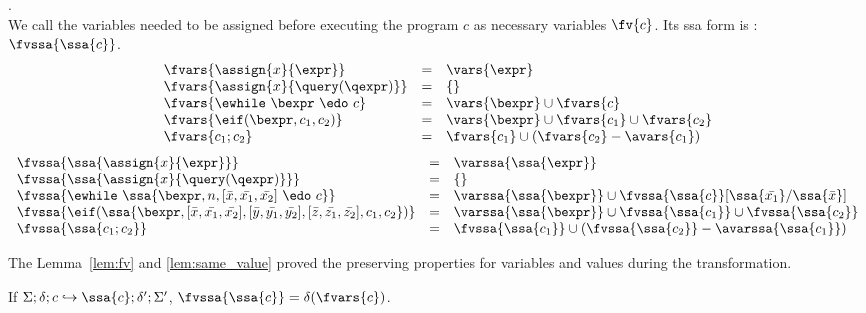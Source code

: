 \begin{defn}.
\\
{
We call the variables needed to be assigned before executing the program $c$ as necessary variables $\fv{c}$. Its ssa form is : $\fvssa{\ssa{c}}$.
}  
 \[
 \begin{array}{lll}
     \fvars{\assign{x}{\expr} }  & = & \vars{\expr}  \\
     \fvars{\assign{x}{\query(\qexpr)} }  & = & \{ \}  \\
     {\fvars{  \ewhile ~ \bexpr ~ \edo ~ c  } }&= & \vars{\bexpr} \cup \fvars{c} \\
     \fvars{\eif(\bexpr, c_1, c_2)} & =& \vars{\bexpr} \cup \fvars{c_1} \cup \fvars{c_2}  \\
      \fvars{c_1 ; c_2} & = & \fvars{c_1} \cup ( \fvars{c_2} - \avars{c_1})
 \end{array}
 \]
 \[
 \begin{array}{lll}
     \fvssa{\ssa{\assign{x}{\expr}} }  & = & \varssa{\ssa{\expr}}  \\
     \fvssa{ \ssa{ \assign{x}{\query(\qexpr)}} }  & = & \{ \}  \\
     {\fvssa{  \ewhile ~ \ssa{\bexpr, n, [\bar{x}, \bar{x_1}, \bar{x_2}] ~ \edo ~ c} } }
     &= & 
     \varssa{\ssa{\bexpr}} \cup \fvssa{\ssa{c}}[\ssa{ \bar{x_1}} / \ssa{\bar{x}}]\\
     \fvssa{\eif(\ssa{\bexpr,[\bar{x}, \bar{x_1}, \bar{x_2}],[\bar{y}, \bar{y_1}, \bar{y_2}],[\bar{z}, \bar{z_1}, \bar{z_2}], c_1, c_2} )} & =& \varssa{\ssa{\bexpr}} \cup \fvssa{\ssa{c_1}} \cup \fvssa{\ssa{c_2}}  \\
      \fvssa{\ssa{c_1 ; c_2}} & = & \fvssa{\ssa{c_1}} \cup ( \fvssa{\ssa{c_2}} - \avarssa{\ssa{c_1}})
 \end{array}
 \]
%
\end{defn}
%
The Lemma~\ref{lem:fv} and \ref{lem:same_value} proved the preserving properties for variables and values during the transformation.
%
\begin{lem}
\label{lem:fv}
If $\Sigma;\delta ; c \hookrightarrow \ssa{c} ; \delta';\Sigma' $, $\fvssa{\ssa{c}} = \delta(\fvars{c})$. 
\end{lem}
